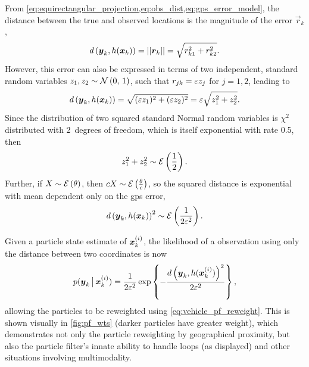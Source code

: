 From \cref{eq:equirectangular_projection,eq:obs_dist,eq:gps_error_model}, the distance between the true and observed locations is the magnitude of the error $\vec{r}_k$,
\begin{equation}
\label{eq:sq_dist}
d\left(\boldsymbol{y}_k, h(\boldsymbol x_k)\right) = ||\boldsymbol{r}_k|| =
    \sqrt{r_{k1}^2 + r_{k2}^2}.
\end{equation}
However, this error can also be expressed in terms of two independent, standard \normal{} random variables $z_1, z_2 \sim \mathcal{N}\left(0,\, 1\right)$, such that $r_{jk} = \varepsilon z_j$ for $j = 1, 2$, leading to
\begin{equation}
d\left(\boldsymbol{y}_k, h(\boldsymbol x_k)\right) =
    \sqrt{(\varepsilon z_1)^2 + (\varepsilon z_2)^2} =
    \varepsilon \sqrt{z_1^2 + z_2^2}.
\end{equation}
Since the distribution of two squared standard Normal random variables is $\chi^2$ distributed with 2~degrees of freedom, which is itself exponential with rate 0.5, then
\begin{equation}
\label{eq:sum_sq_dist}
z_1^2 + z_2^2 \sim \mathcal{E}\left(\frac{1}{2}\right).
\end{equation}
Further, if $X \sim \mathcal{E}\left(\theta\right)$, then $cX \sim \mathcal{E}\left(\frac{\theta}{c}\right)$, so the squared distance is exponential with mean dependent only on the \gls{gps} error,
\begin{equation}
\label{eq:distance_distrib}
d\left(\boldsymbol{y}_k, h(\boldsymbol x_k)\right)^2 \sim \mathcal{E}\left(\frac{1}{2\varepsilon^2}\right).
\end{equation}

Given a particle state estimate of $\boldsymbol x^{(i)}_k$,
the likelihood of a \GPS{} observation using only
the distance between two coordinates is now
\begin{equation}
\label{eq:particle_lh_fun}
p(\boldsymbol{y}_k \,\big|\,{} \boldsymbol x^{(i)}_k) =
    \frac{1}{2\varepsilon^2} \exp\left\{
        - \frac{d\left(\boldsymbol{y}_k, h(\boldsymbol x^{(i)}_k)\right)^2}{2\varepsilon^2}
    \right\},
\end{equation}
allowing the particles to be reweighted using \cref{eq:vehicle_pf_reweight}. This is shown visually in \cref{fig:pf_wts} (darker particles have greater weight), which demonstrates not only the particle reweighting by geographical proximity, but also the particle filter's innate ability to handle loops (as displayed) and other situations involving multimodality.


